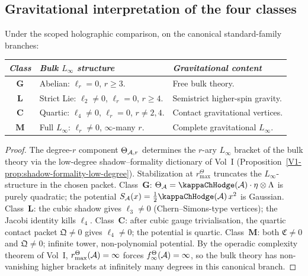 
\subsection{Gravitational interpretation of the four classes}

\begin{theorem}
\ClaimStatusProvedHere
{}
Under the scoped holographic comparison, on the canonical
standard-family branches:
\begin{center}
\small
\renewcommand{\arraystretch}{1.25}
\begin{tabular}{c@{\quad}l@{\quad}l}
\toprule
\emph{Class} & \emph{Bulk $L_\infty$ structure} &
\emph{Gravitational content} \\
\midrule
$\mathbf{G}$ &
 Abelian: $\ell_r = 0$, $r \geq 3$. &
 Free bulk theory. \\
$\mathbf{L}$ &
 Strict Lie: $\ell_2 \neq 0$, $\ell_r = 0$, $r \geq 4$. &
 Semistrict higher-spin gravity. \\
$\mathbf{C}$ &
 Quartic: $\ell_4 \neq 0$, $\ell_r = 0$, $r \neq 2,4$. &
 Contact gravitational vertices. \\
$\mathbf{M}$ &
 Full $L_\infty$: $\ell_r \neq 0$, $\infty$-many $r$. &
 Complete gravitational $L_\infty$. \\
\bottomrule
\end{tabular}
\end{center}
\end{theorem}

\begin{proof}
The degree-$r$ component $\Theta_{\mathcal{A},r}$ determines the $r$-ary
$L_\infty$ bracket of the bulk theory via
the low-degree shadow--formality dictionary of Vol~I
\textup{(}Proposition~\textup{\ref*{V1-prop:shadow-formality-low-degree}}\textup{)}.
Stabilization at \(r^\Theta_{\max}\) truncates the \(L_\infty\)-structure
in the chosen packet.
Class~$\mathbf{G}$: $\Theta_\cA = \kappaChHodge(\cA) \cdot \eta \otimes
\Lambda$ is purely quadratic; the potential
$S_\cA(x) = \frac{1}{2}\kappaChHodge(\cA)\,x^2$ is Gaussian.
Class~$\mathbf{L}$: the cubic shadow gives $\ell_3 \neq 0$
(Chern--Simons-type vertices); the Jacobi identity kills $\ell_4$.
Class~$\mathbf{C}$: after cubic gauge trivialisation, the quartic
contact packet \(\mathfrak{Q} \neq 0\) gives \(\ell_4\neq0\);
the potential is quartic. Class~$\mathbf{M}$: both $\mathfrak{C} \neq 0$ and
$\mathfrak{Q} \neq 0$; infinite tower, non-polynomial potential.
By the operadic complexity theorem of Vol~I,
\(r^\Theta_{\max}(\mathcal{A})=\infty\) forces
\(f^\Theta_\infty(\mathcal{A})=\infty\), so the bulk theory has
non-vanishing higher brackets at infinitely many degrees in this
canonical branch.
\end{proof}


